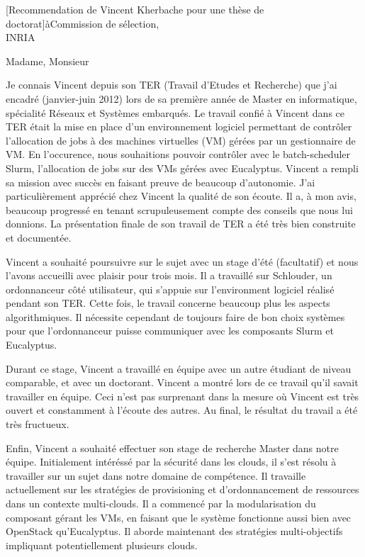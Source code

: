 \documentclass[a4paper,10pt]{article}
\begin{document}

\begin{letter}[Recommendation de Vincent Kherbache pour une thèse de doctorat]{à}{Commission de sélection,\\INRIA}

Madame, Monsieur

Je connais Vincent depuis son TER (Travail d'Etudes et Recherche) que j'ai
encadré (janvier-juin 2012) lors de sa première année de Master en informatique,
spécialité Réseaux et Systèmes embarqués. 
Le travail confié à Vincent dans ce TER était la mise en place d'un environnement
logiciel permettant de contrôler l'allocation de jobs à des machines virtuelles (VM)
gérées par un gestionnaire de VM. En l'occurence, nous souhaitions pouvoir contrôler
avec le batch-scheduler Slurm, l'allocation de jobs sur des VMs gérées avec Eucalyptus. 
Vincent a rempli sa mission avec succès en faisant preuve de beaucoup d'autonomie. 
J'ai particulièrement apprécié chez Vincent la qualité de son écoute. Il a, à mon
avis, beaucoup progressé en tenant scrupuleusement compte des conseils que nous lui
donnions. La présentation finale de son travail de TER a été très bien construite et 
documentée.


Vincent a souhaité poursuivre sur le sujet avec un stage d'été (facultatif) et nous
l'avons accueilli avec plaisir pour trois mois. Il a travaillé sur Schlouder, un ordonnanceur
côté utilisateur, qui s'appuie sur l'environment logiciel réalisé pendant son TER.
Cette fois, le travail concerne beaucoup plus les aspects algorithmiques. Il
nécessite cependant de toujours faire de bon choix systèmes pour 
que l'ordonnanceur puisse communiquer avec les composants Slurm et Eucalyptus.


Durant ce stage, Vincent a travaillé en équipe avec un autre étudiant de niveau
comparable, et avec un doctorant. Vincent a montré lors de ce travail qu'il savait 
travailler en équipe.  Ceci n'est pas surprenant dans la mesure où Vincent est très 
ouvert et constamment à l'écoute des autres.
Au final, le résultat du travail a été très fructueux. 


Enfin, Vincent a souhaité effectuer son stage de recherche Master dans notre équipe.
Initialement intéréssé par la sécurité dans les clouds, il s'est résolu à 
travailler sur un sujet dans notre domaine de compétence. Il travaille actuellement
sur les stratégies de provisioning et d'ordonnancement de ressources dans un
contexte multi-clouds. Il a commencé par la modularisation du composant gérant
les VMs, en faisant que le système fonctionne aussi bien avec OpenStack qu'Eucalyptus.
Il aborde maintenant des stratégies multi-objectifs impliquant potentiellement plusieurs
clouds.



\end{letter}
\end{document}
